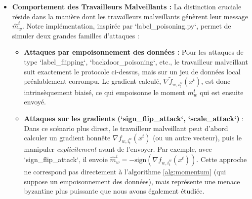 \documentclass{article}
\begin{document}
\begin{itemize}
    \item \textbf{Comportement des Travailleurs Malveillants :} La distinction cruciale réside dans la manière dont les travailleurs malveillants génèrent leur message $\hat{m}_w^t$. Notre implémentation, inspirée par `label_poisoning.py`, permet de simuler deux grandes familles d'attaques :
    \begin{itemize}
        \item \textbf{Attaques par empoisonnement des données :} Pour les attaques de type `label_flipping`, `backdoor_poisoning`, etc., le travailleur malveillant suit exactement le protocole ci-dessus, mais sur un jeu de données local préalablement corrompu. Le gradient calculé, $\nabla \tilde{f}_{w,i_t^w}(x^t)$, est donc intrinsèquement biaisé, ce qui empoisonne le moment $m_w^t$ qui est ensuite envoyé.
        \item \textbf{Attaques sur les gradients (`sign_flip_attack`, `scale_attack`)} : Dans ce scénario plus direct, le travailleur malveillant peut d'abord calculer un gradient honnête $\nabla f_{w,i_t^w}(x^t)$ (ou un autre vecteur), puis le manipuler \textit{explicitement} avant de l'envoyer. Par exemple, avec `sign_flip_attack`, il envoie $\hat{m}_w^t = -\text{sign}(\nabla f_{w,i_t^w}(x^t))$. Cette approche ne correspond pas directement à l'algorithme \ref{alg:momentum} (qui suppose un empoisonnement des données), mais représente une menace byzantine plus puissante que nous avons également étudiée.
    \end{itemize}
\end{itemize}
\end{document}
